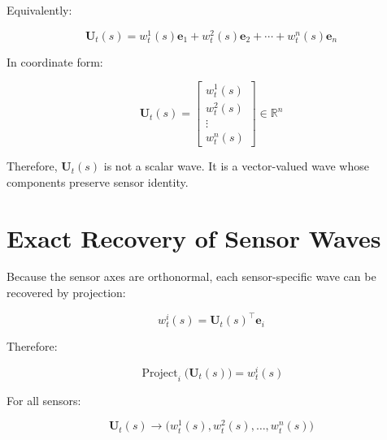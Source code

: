 \documentclass[a4paper]{article}
\newcommand{\Project}{\operatorname{Project}}
\begin{document}
        Equivalently:
        
        \begin{equation}
            \mathbf{U}_t(s)
            =
            w_t^1(s)\mathbf{e}_1
            +
            w_t^2(s)\mathbf{e}_2
            +
            \cdots
            +
            w_t^n(s)\mathbf{e}_n
        \end{equation}
        
        In coordinate form:
        
        \begin{equation}
            \mathbf{U}_t(s)
            =
            \begin{bmatrix}
                w_t^1(s)
                \\
                w_t^2(s)
                \\
                \vdots
                \\
                w_t^n(s)
            \end{bmatrix}
            \in
            \mathbb{R}^{n}
        \end{equation}
        
        Therefore, \(\mathbf{U}_t(s)\) is not a scalar wave.
        It is a vector-valued wave whose components preserve sensor identity.
    
    
    \section{Exact Recovery of Sensor Waves}
        
        Because the sensor axes are orthonormal, each sensor-specific wave can be recovered by projection:
        
        \begin{equation}
            w_t^i(s)
            =
            \mathbf{U}_t(s)^{\top}
            \mathbf{e}_i
        \end{equation}
        
        Therefore:
        
        \begin{equation}
            \Project_i
            \bigl(
            \mathbf{U}_t(s)
            \bigr)
            =
            w_t^i(s)
        \end{equation}
        
        For all sensors:
        
        \begin{equation}
            \mathbf{U}_t(s)
            \longrightarrow
            \bigl(
            w_t^1(s),
            w_t^2(s),
            \ldots,
            w_t^n(s)
            \bigr)
        \end{equation}
        
\end{document}
